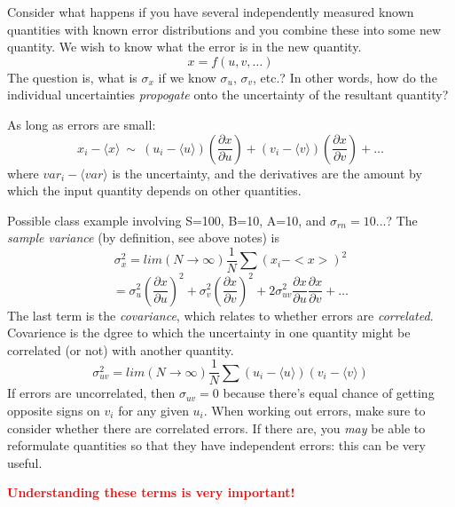 \documentclass[12pt]{article}
\newcommand{\mynotes}[1]{\textcolor{myBlue}{#1}}
\begin{document}
Consider what happens if you have several independently measured known
quantities with known error distributions and you combine these into some new
quantity. We wish to know what the error is in the new quantity.
\[
    x = f(u, v, \ldots)
    \]
The question is, what is $\sigma_x$ if we know
$\sigma_u$, $\sigma_v$, etc.?
\mynotes{In other words, how do the individual uncertainties
\emph{propogate} onto the uncertainty of the resultant quantity?}

As long as errors are small:
\[
    x_{i} -  \langle x \rangle  \ \sim \
    (u_{i} -  \langle u \rangle )\left(\frac{\partial x}{\partial u}\right)
    + (v_{i} -  \langle v \rangle )\left( \frac{\partial x}{\partial v}  \right)
    + \ldots
    \]
where $var_{i} -  \langle var \rangle $ is the uncertainty, and the derivatives are the
amount by which the input quantity depends on other quantities.

\mynotes{Possible class example involving
S=100, B=10, A=10, and $\sigma_{rn}=10\ldots$?
The \emph{sample variance} (by definition, see above notes) is}
\[
    \sigma_{x}^{2} = lim(N \rightarrow \infty)\frac{1}{N} \sum(x_{i} - <x>)^{2}
    \]
\[
    = \sigma_u^{2}\left(\frac{\partial x}{\partial u}\right)^{2}
    + \sigma_v^{2}\left(\frac{\partial x}{\partial v}\right)^{2}
    + 2\sigma_{uv}^{2}\frac{\partial x}{\partial u}
    \frac{\partial x}{\partial v} + \ldots
    \]
The last term is the \textit{covariance}, which relates to whether errors are
\textit{correlated}.
\mynotes{Covarience is the dgree to which the uncertainty
in one quantity might be correlated (or not) with another quantity}.
\[
    \sigma_{uv}^{2} = lim(N \rightarrow\infty)\frac{1}{N}
    \sum(u_{i} -  \langle u \rangle )(v_{i} -  \langle v \rangle )
    \]
If errors are uncorrelated, then $\sigma_{uv} = 0$ because there's
equal chance of getting opposite signs on $v_{i}$ for any given $u_{i}$.
When working out errors, make sure to consider whether there are
correlated errors. If there are, you \emph{may} be able to reformulate
quantities so that they have independent errors: this can be very
useful.

\textcolor{red}{\textbf{Understanding these terms is very important!}}
\end{document}
